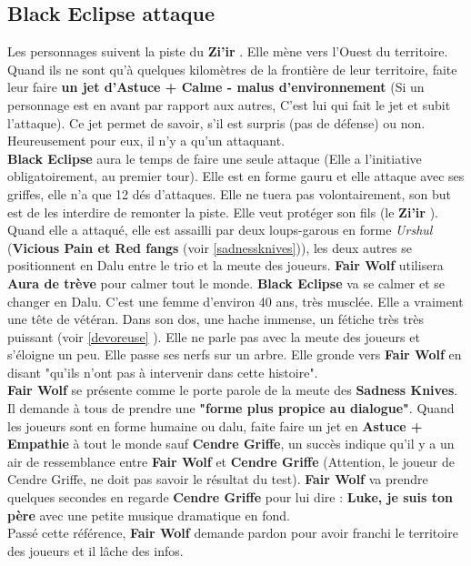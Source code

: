\documentclass[oneside,12pt]{book}
\newcommand{\BlackEclipse}{\textbf{Black Eclipse} }
\newcommand{\Thomas}{\textbf{Zi'ir} }
\begin{document}
\begin{flushleft}
\section{\BlackEclipse attaque}
\label{black_eclipse}
Les personnages suivent la piste du \Thomas. Elle mène vers l'Ouest du territoire. Quand ils ne sont qu'à quelques kilomètres de la frontière de leur territoire, faite leur faire \textbf{un jet d'Astuce + Calme - malus d'environnement} (Si un personnage est en avant par rapport aux autres, C'est lui qui fait le jet et subit l'attaque). 
Ce jet permet de savoir, s'il est surpris (pas de défense) ou non. Heureusement pour eux, il n'y a qu'un attaquant. \\
\BlackEclipse aura le temps de faire une seule attaque (Elle a l'initiative obligatoirement, au premier tour). 
Elle est en forme gauru et elle attaque avec ses griffes, elle n'a que 12 dés d'attaques. 
Elle ne tuera pas volontairement, son but est de les interdire de remonter la piste.
Elle veut protéger son fils (le \Thomas).\\
Quand elle a attaqué, elle est assailli par deux loups-garous en forme \textit{Urshul} (\textbf{Vicious Pain et Red fangs} (voir \ref{sadnessknives})), les deux autres se positionnent en Dalu entre le trio et la meute des joueurs. \textbf{Fair Wolf} utilisera \textbf{Aura de trève} pour calmer tout le monde.
\BlackEclipse va se calmer et se changer en Dalu. C'est une femme d'environ 40 ans, très musclée. Elle a vraiment une tête de vétéran. Dans son dos, une hache immense, un fétiche très très puissant (voir \ref{devoreuse} ). Elle ne parle pas avec la meute des joueurs et s'éloigne un peu. Elle passe ses nerfs sur un arbre. Elle gronde vers \textbf{Fair Wolf} en disant "qu'ils n'ont pas à intervenir dans cette histoire". \\ 
\textbf{Fair Wolf} se présente comme le porte parole de la meute des \textbf{Sadness Knives}. Il demande à tous de prendre une \textbf{"forme plus propice au dialogue"}. Quand les joueurs sont en forme humaine ou dalu, faite faire un jet en \textbf{Astuce + Empathie} à tout le monde sauf \textbf{Cendre Griffe}, un succès indique qu'il y a un air de ressemblance entre \textbf{Fair Wolf} et \textbf{Cendre Griffe} (Attention, le joueur de Cendre Griffe, ne doit pas savoir le résultat du test). \textbf{Fair Wolf} va prendre quelques secondes en regarde \textbf{Cendre Griffe} pour lui dire :  {\Large \textbf{Luke, je suis ton père}} avec une petite musique dramatique en fond. \\
Passé cette référence, \textbf{Fair Wolf} demande pardon pour avoir franchi le territoire des joueurs et il lâche des infos. \\

\end{flushleft}
\end{document}
